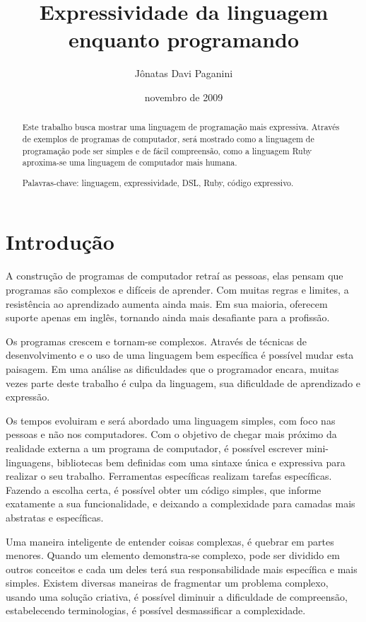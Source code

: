 \documentclass[espaco=simples,appendix=Name]{abnt}
\title{Expressividade da linguagem enquanto programando}
\author{Jônatas Davi Paganini}
\date{novembro de 2009}
\begin{document}
\maketitle
\begin{abstract}
Este trabalho busca mostrar uma linguagem de programação mais expressiva. Através de exemplos de programas de computador, será mostrado como a linguagem de programação pode ser simples e de fácil compreensão, como a linguagem Ruby aproxima-se uma linguagem de computador mais humana.

Palavras-chave: linguagem, expressividade, DSL, Ruby, código expressivo.
\end{abstract}


\chapter{Introdução}

A construção de programas de computador retraí as pessoas, elas pensam que programas são complexos e difíceis de aprender. Com muitas regras e limites, a resistência ao aprendizado aumenta ainda mais. Em sua maioria, oferecem suporte apenas em inglês, tornando ainda mais desafiante para a profissão. 

 Os programas crescem e tornam-se complexos. Através de técnicas de desenvolvimento e o uso de uma linguagem bem específica é possível mudar esta paisagem. Em uma análise as dificuldades que o programador encara, muitas vezes parte deste trabalho é culpa da linguagem, sua dificuldade de aprendizado e expressão.

Os tempos evoluiram e será abordado uma linguagem simples, com foco nas pessoas e não nos computadores. Com o objetivo de chegar mais próximo da realidade externa a um programa de computador, é possível escrever mini-linguagens, bibliotecas bem definidas com uma sintaxe única e expressiva para realizar o seu trabalho. Ferramentas específicas realizam tarefas específicas. Fazendo a escolha certa, é possível obter um código simples, que informe exatamente a sua funcionalidade, e deixando a complexidade para camadas mais abstratas e específicas.  

Uma maneira inteligente de entender coisas complexas, é quebrar em partes menores. Quando um elemento demonstra-se complexo, pode ser dividido em outros conceitos e cada um deles terá sua responsabilidade mais específica e mais simples. Existem diversas maneiras de fragmentar um problema complexo, usando uma solução criativa, é possível diminuir a dificuldade de compreensão, estabelecendo terminologias, é possível desmassificar a complexidade.\cite{NazemiExpressiveCode}
\end{document}
